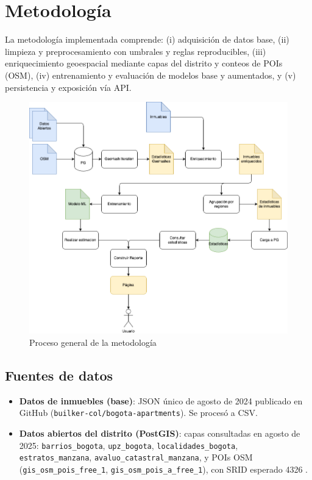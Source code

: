 \section*{Metodología}
La metodología implementada comprende: (i) adquisición de datos base, (ii) limpieza y preprocesamiento con umbrales y reglas reproducibles, (iii) enriquecimiento geoespacial mediante capas del distrito y conteos de POIs (OSM), (iv) entrenamiento y evaluación de modelos base y aumentados, y (v) persistencia y exposición vía API.

\begin{figure}[h]
    \centering
    \includegraphics[width=0.85\linewidth]{Images/metodologia.png}
    \caption{Proceso general de la metodología}
    \label{fig:metodologia}
\end{figure}

\subsection*{Fuentes de datos}
\begin{itemize}
    \item \textbf{Datos de inmuebles (base)}: JSON único de agosto de 2024 publicado en GitHub (\texttt{builker-col/bogota-apartments}). Se procesó a CSV.
    \item \textbf{Datos abiertos del distrito (PostGIS)}: capas consultadas en agosto de 2025: \texttt{barrios\_bogota}, \texttt{upz\_bogota}, \texttt{localidades\_bogota}, \texttt{estratos\_manzana}, \texttt{avaluo\_catastral\_manzana}, y POIs OSM (\texttt{gis\_osm\_pois\_free\_1}, \texttt{gis\_osm\_pois\_a\_free\_1}), con SRID esperado 4326 \cite{datosabiertos_bogota}.
\end{itemize}

